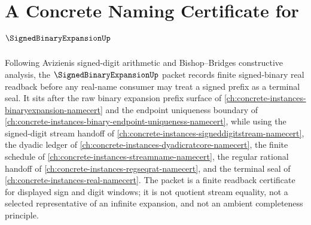 \chapter{A Concrete Naming Certificate for $\SignedBinaryExpansionUp$}
\label{ch:concrete-instances-signed-binary-expansion-namecert}

Following Avizienis signed-digit arithmetic and Bishop--Bridges constructive analysis, the $\SignedBinaryExpansionUp$ packet records finite signed-binary real readback before any real-name consumer may treat a signed prefix as a terminal seal. It sits after the raw binary expansion prefix surface of \autoref{ch:concrete-instances-binaryexpansion-namecert} and the endpoint uniqueness boundary of \autoref{ch:concrete-instances-binary-endpoint-uniqueness-namecert}, while using the signed-digit stream handoff of \autoref{ch:concrete-instances-signeddigitstream-namecert}, the dyadic ledger of \autoref{ch:concrete-instances-dyadicratcore-namecert}, the finite schedule of \autoref{ch:concrete-instances-streamname-namecert}, the regular rational handoff of \autoref{ch:concrete-instances-regseqrat-namecert}, and the terminal seal of \autoref{ch:concrete-instances-real-namecert}. The packet is a finite readback certificate for displayed sign and digit windows; it is not quotient stream equality, not a selected representative of an infinite expansion, and not an ambient completeness principle.


